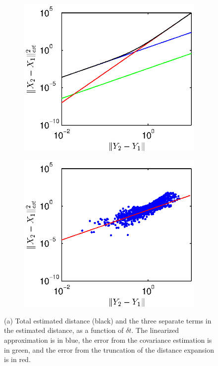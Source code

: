 \documentclass[1p]{elsarticle}
\begin{document}
\begin{figure}[h]
\begin{subfigure}{0.5\textwidth}
\includegraphics[width=\textwidth]{errors_function_dy}
\caption{}
\end{subfigure}
\begin{subfigure}{0.5\textwidth}
\includegraphics[width=\textwidth]{empirical_totaldist_function_dy}
\caption{}
\end{subfigure}
\caption{(a) Total estimated distance (black) and the three separate terms in the estimated distance, as a function of $\delta t$. The linearized approximation is in blue, the error from the covariance estimation is in green, and the error from the truncation of the distance expansion is in red. 
}
\end{figure}
\end{document}
